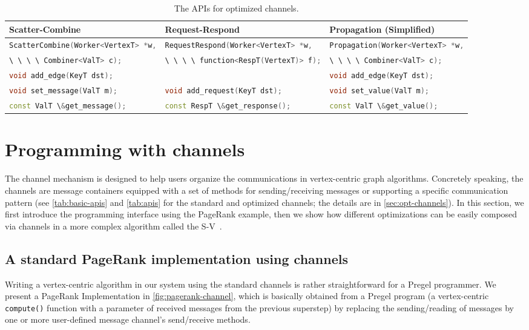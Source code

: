 \documentclass{sokendai_thesis} %
\newcommand{\inlineCPP}[1]{\lstinline[basicstyle=\small\ttfamily,language=c++]|#1|}
\begin{document}
\begin{table}[t]
\centering
\caption{The APIs for optimized channels.}
\label{tab:apis}
\begin{tabular}{l|l|l}
\hline
  \textbf{Scatter-Combine}
& \textbf{Request-Respond}
& \textbf{Propagation (Simplified)} \\
\hline
  \inlineCPP{ScatterCombine(Worker<VertexT> *w,}
& \inlineCPP{RequestRespond(Worker<VertexT> *w,}
& \inlineCPP{Propagation(Worker<VertexT> *w,} \\
  \inlineCPP{\ \ \ \ Combiner<ValT> c);}
& \inlineCPP{\ \ \ \ function<RespT(VertexT)> f);}
& \inlineCPP{\ \ \ \ Combiner<ValT> c);} \\
\hline
  \inlineCPP{void add_edge(KeyT dst);}
&
& \inlineCPP{void add_edge(KeyT dst);} \\
\hline
  \inlineCPP{void set_message(ValT m);}
& \inlineCPP{void add_request(KeyT dst);}
& \inlineCPP{void set_value(ValT m);} \\
  \inlineCPP{const ValT \&get_message();}
& \inlineCPP{const RespT \&get_response();}
& \inlineCPP{const ValT \&get_value();} \\
\hline
\end{tabular}
\end{table}

\section{Programming with channels}
\label{sec:programming}

The channel mechanism is designed to help users organize the communications in vertex-centric graph algorithms.
Concretely speaking, the channels are message containers equipped with a set of methods for sending/receiving messages or supporting a specific communication pattern (see \autoref{tab:basic-apis} and \autoref{tab:apis} for the standard and optimized channels; the details are in \autoref{sec:opt-channels}).
In this section, we first introduce the programming interface using the PageRank example, then we show how different optimizations can be easily composed via channels in a more complex algorithm called the S-V~\cite{ShVi82}.

\subsection{A standard PageRank implementation using channels}

Writing a vertex-centric algorithm in our system using the standard channels is rather straightforward for a Pregel programmer.
We present a PageRank Implementation in \autoref{fig:pagerank-channel}, which is basically obtained from a Pregel program (a vertex-centric \texttt{compute()} function with a parameter of received messages from the previous superstep) by replacing the sending/reading of messages by one or more user-defined message channel's send/receive methods.
\end{document}
